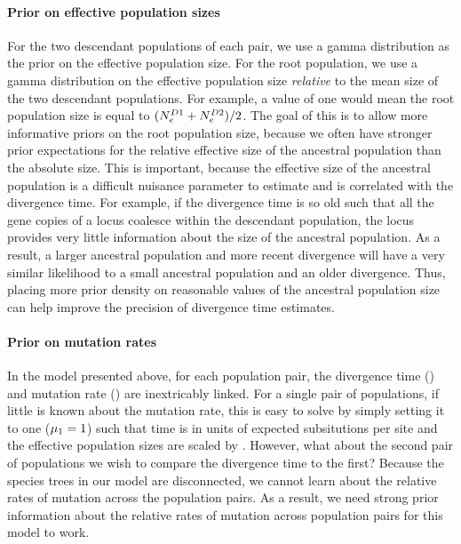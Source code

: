 \paragraph{Prior on effective population sizes}
For the two descendant populations of each pair, we use a gamma distribution as
the prior on the effective population size.
For the root population, we use a gamma distribution on the effective
population size \emph{relative} to the mean size of the two descendant
populations.
For example, a value of one would mean the root population size is equal to 
$(\epopsize[\descendantpopindex{1}] + \epopsize[\descendantpopindex{2}]) / 2$.
The goal of this is to allow more informative priors on the root population size,
because we often have stronger prior expectations for the relative effective
size of the ancestral population than the absolute size.
This is important, because the effective size of the ancestral population is a
difficult nuisance parameter to estimate and is correlated with the divergence
time.
For example, if the divergence time is so old such that all the gene copies
of a locus coalesce within the descendant population, the locus
provides very little information about the size of the ancestral
population.
As a result, a larger ancestral population and more recent divergence will have
a very similar likelihood to a small ancestral population and an older
divergence.
Thus, placing more prior density on reasonable values of the ancestral
population size can help improve the precision of divergence time estimates.

\paragraph{Prior on mutation rates}
In the model presented above, for each population pair, the divergence time
(\divtime) and mutation rate (\murate[i]) are inextricably linked.
For a single pair of populations, if little is known about the mutation rate,
this is easy to solve by simply setting it to one ($\murate[1] = 1$) such that
time is in units of expected subsitutions per site and the effective population
sizes are scaled by \murate.
However, what about the second pair of populations we wish to compare the
divergence time to the first?
Because the species trees in our model are disconnected, we cannot learn about
the relative rates of mutation across the population pairs.
As a result, we need strong prior information about the relative rates of
mutation across population pairs for this model to work.

